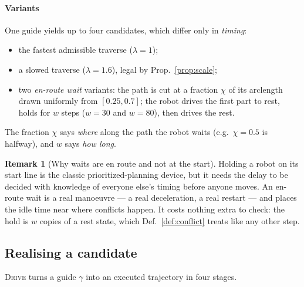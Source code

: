 \documentclass[conference]{IEEEtran}
\theoremstyle{plain}
\theoremstyle{definition}
\newtheorem{remark}{Remark}
\begin{document}
\paragraph*{Variants}
One guide yields up to four candidates, which differ only in \emph{timing}:
\begin{itemize}
  \item the fastest admissible traverse ($\lambda = 1$);
  \item a slowed traverse ($\lambda = 1.6$), legal by Prop.~\ref{prop:scale};
  \item two \emph{en-route wait} variants: the path is cut at a fraction $\chi$ of its
        arclength drawn uniformly from $[0.25, 0.7]$; the robot drives the first part to
        rest, holds for $w$ steps ($w = 30$ and $w = 80$), then drives the rest.
\end{itemize}
The fraction $\chi$ says \emph{where} along the path the robot waits (e.g.\ $\chi = 0.5$ is
halfway), and $w$ says \emph{how long}.

\begin{remark}[Why waits are en route and not at the start]
Holding a robot on its start line is the classic prioritized-planning device, but it needs
the delay to be decided with knowledge of everyone else's timing before anyone moves. An
en-route wait is a real manoeuvre --- a real deceleration, a real restart --- and places the
idle time near where conflicts happen. It costs nothing extra to check: the hold is $w$ copies
of a rest state, which Def.~\ref{def:conflict} treats like any other step.
\end{remark}

\subsection{Realising a candidate}
\label{sec:realise}

\textsc{Drive} turns a guide $\gamma$ into an executed trajectory in four stages.
\end{document}
